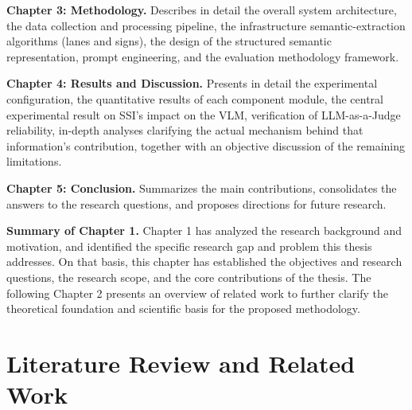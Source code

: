 \documentclass[12pt,a4paper]{report}
\begin{document}
\textbf{Chapter 3: Methodology.} Describes in detail the overall system architecture, the data collection and processing pipeline, the infrastructure semantic-extraction algorithms (lanes and signs), the design of the structured semantic representation, prompt engineering, and the evaluation methodology framework.

\textbf{Chapter 4: Results and Discussion.} Presents in detail the experimental configuration, the quantitative results of each component module, the central experimental result on SSI's impact on the VLM, verification of LLM-as-a-Judge reliability, in-depth analyses clarifying the actual mechanism behind that information's contribution, together with an objective discussion of the remaining limitations.

\textbf{Chapter 5: Conclusion.} Summarizes the main contributions, consolidates the answers to the research questions, and proposes directions for future research.

\textbf{Summary of Chapter 1.} Chapter 1 has analyzed the research background and motivation, and identified the specific research gap and problem this thesis addresses. On that basis, this chapter has established the objectives and research questions, the research scope, and the core contributions of the thesis. The following Chapter 2 presents an overview of related work to further clarify the theoretical foundation and scientific basis for the proposed methodology.

\chapter{Literature Review and Related Work}
\end{document}
